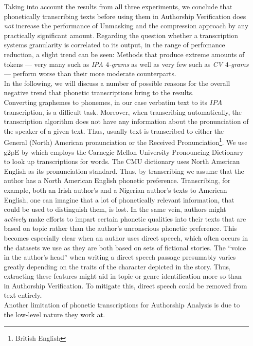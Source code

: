 Taking into account the results from all three experiments, we conclude that phonetically transcribing texts before using them in Authorship Verification does \textit{not} increase the performance of Unmasking and the compression approach by any practically significant amount.
Regarding the question whether a transcription systems granularity is correlated to its output, in the range of perfomance reduction, a slight trend can be seen:
Methods that produce extreme amounts of tokens --- very many such as \textit{IPA $4$-grams} as well as very few such as \textit{CV $4$-grams} --- perform worse than their more moderate counterparts.\\
In the following, we will discuss a number of possible reasons for the overall negative trend that phonetic transcriptions bring to the results.\\
Converting graphemes to phonemes, in our case verbatim text to its $IPA$ transcription, is a difficult task.
Moreover, when transcribing automatically, the transcription algorithm does not have any information about the pronunciation of the speaker of a given text.
Thus, usually text is transcribed to either the General (North) American pronunciation or the Received Pronunciation\footnote{British English}.
We use g2pE by \cite{kyubyong2019g2pE} which employs the Carnegie Mellon University Pronouncing Dictionary to look up transcriptions for words.
The CMU dictionary uses North American English as its pronunciation standard.
Thus, by transcribing we assume that the author has a North American English phonetic preference.
Transcribing, for example, both an Irish author's and a Nigerian author's texts to American English, one can imagine that a lot of phonetically relevant information, that could be used to distinguish them, is lost.
In the same vein, authors might \textit{actively} make efforts to impart certain phonetic qualities into their texts that are based on topic rather than the author's unconscious phonetic preference.
This becomes especially clear when an author uses direct speech, which often occurs in the datasets we use as they are both based on sets of fictional stories.
The ``voice in the author's head'' when writing a direct speech passage presumably varies greatly depending on the traits of the character depicted in the story.
Thus, extracting these features might aid in topic or genre identification more so than in Authorship Verification.
To mitigate this, direct speech could be removed from text entirely.\\
Another limitation of phonetic transcriptions for Authorship Analysis is due to the low-level nature they work at.
